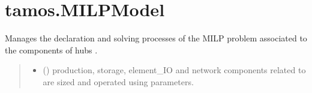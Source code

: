 \documentclass[letterpaper,10pt,english]{sphinxmanual}
\begin{document}
\sphinxstepscope


\section{tamos.MILPModel}
\label{\detokenize{generated/tamos.MILPModel:tamos-milpmodel}}\label{\detokenize{generated/tamos.MILPModel::doc}}

\begin{fulllineitems}
\label{\detokenize{generated/tamos.MILPModel:tamos.MILPModel}}
\pysigstartsignatures
{}
\pysigstopsignatures{}

\begin{fulllineitems}
\label{\detokenize{generated/tamos.MILPModel:tamos.MILPModel.__init__}}
\pysigstartsignatures
{}
\pysigstopsignatures
\sphinxAtStartPar
Manages the declaration and solving processes of the MILP problem associated to the components of hubs .
\begin{quote}\begin{description}
\begin{itemize}
\item {} 
\sphinxAtStartPar
{} ({\hyperref[\detokenize{generated/tamos.Hub:tamos.Hub}]{}}) \textendash{} production, storage, element\_IO and network components related to 
are sized and operated using  parameters.


\end{itemize}
\end{description}
\end{quote}
\end{fulllineitems}
\end{fulllineitems}
\end{document}
